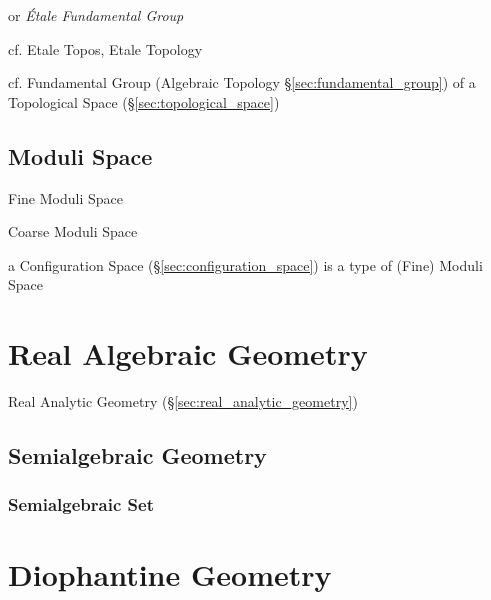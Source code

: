 or \emph{\'Etale Fundamental Group}

cf. Etale Topos, Etale Topology

cf. Fundamental Group (Algebraic Topology \S\ref{sec:fundamental_group}) of a
Topological Space (\S\ref{sec:topological_space})



\subsection{Moduli Space}\label{sec:moduli_space}

Fine Moduli Space

Coarse Moduli Space

a Configuration Space (\S\ref{sec:configuration_space}) is a type of (Fine)
Moduli Space



\section{Real Algebraic Geometry}\label{sec:real_algebraic_geometry}

Real Analytic Geometry (\S\ref{sec:real_analytic_geometry})



\subsection{Semialgebraic Geometry}\label{sec:semialgebraic_geometry}

\subsubsection{Semialgebraic Set}\label{sec:semialgebraic_set}



\section{Diophantine Geometry}\label{sec:diophantine_geometry}

